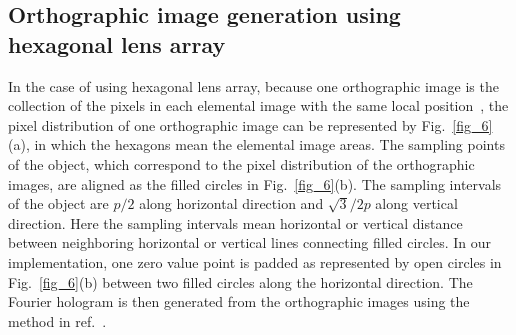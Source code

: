 \documentclass[10pt,letterpaper]{article}
\begin{document}
\subsection{Orthographic image generation using hexagonal lens array}

In the case of using hexagonal lens array, because one orthographic image is the collection of the pixels in each elemental image with the same local position~\cite{Park_2009_OE,Zhang_2006_CSVT,Park_2008_OE}, the pixel distribution of one orthographic image can be represented by Fig.~\ref{fig_6}(a), in which the hexagons mean the elemental image areas. The sampling points of the object, which correspond to the pixel distribution of the orthographic images, are aligned as the filled circles in Fig.~\ref{fig_6}(b). The sampling intervals of the object are $p/2$ along horizontal direction and $\sqrt{3}/2p$ along vertical direction. Here the sampling intervals mean horizontal or vertical distance between neighboring horizontal or vertical lines connecting filled circles. In our implementation, one zero value point is padded as represented by open circles in Fig.~\ref{fig_6}(b) between two filled circles along the horizontal direction. The Fourier hologram is then generated from the orthographic images using the method in ref.~\cite{Park_2009_OE}.
\end{document}
